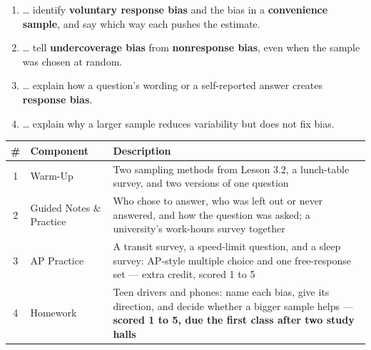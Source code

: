 \documentclass[12pt]{article}
\begin{document}

\namedateperiod
\vspace{0.18in}

\boxguard[14]
\begin{learningtargetbox}
\small
\begin{enumerate}[leftmargin=1.5em, itemsep=5pt]
  \item \ldots{} identify \textbf{voluntary response bias} and the bias in a
        \textbf{convenience sample}, and say which way each pushes the estimate.
  \item \ldots{} tell \textbf{undercoverage bias} from \textbf{nonresponse bias}, even when
        the sample was chosen at random.
  \item \ldots{} explain how a question's wording or a self-reported answer creates
        \textbf{response bias}.
  \item \ldots{} explain why a larger sample reduces variability but does not fix bias.
\end{enumerate}
\end{learningtargetbox}

\vspace{0.14in}

\boxguard[14]
\begin{tocbox}
\small
\renewcommand{\arraystretch}{1.5}
\begin{tabularx}{\linewidth}{@{} c l X @{}}
\rowcolor{sky}
\textbf{\#} & \textbf{Component} & \textbf{Description} \\
\midrule
1 & Warm-Up & Two sampling methods from Lesson 3.2, a lunch-table survey, and two versions
                 of one question \\
2 & Guided Notes \& Practice & Who chose to answer, who was left out or never answered, and
                 how the question was asked; a university's work-hours survey together \\
3 & AP Practice & A transit survey, a speed-limit question, and a sleep survey: AP-style
                 multiple choice and one free-response set --- extra credit, scored 1 to 5 \\
4 & Homework & Teen drivers and phones: name each bias, give its direction, and decide whether
                 a bigger sample helps --- \textbf{scored 1 to 5, due the first class after two
                 study halls} \\
\end{tabularx}
\end{tocbox}
\end{document}

